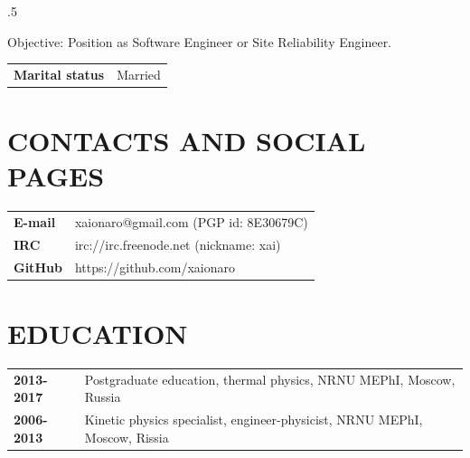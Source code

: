 \address{Limassol, Cyprus}


\begin{resume}
\vspace{0.1in}
\moveleft.5\sectionwidth\centerline{Objective: Position as Software Engineer or Site Reliability Engineer.}

\begin{tabular}{rl}
 {\bf Marital status} & Married\\
\end{tabular}

\section{CONTACTS AND SOCIAL PAGES}
\vspace{0.1in} 
\begin{tabular}{ll}
 {\bf E-mail} & xaionaro@gmail.com (PGP id: 8E30679C)\\
 {\bf IRC}    & irc://irc.freenode.net (nickname: xai)\\
 {\bf GitHub} & https://github.com/xaionaro\\
\end{tabular}

\section{EDUCATION}
\vspace{0.1in} 
\begin{tabular}{ll}
 {\bf 2013-2017} & Postgraduate education, thermal physics, NRNU MEPhI, Moscow, Russia\\
 {\bf 2006-2013} & Kinetic physics specialist, engineer-physicist, NRNU MEPhI, Moscow, Rissia\\
\end{tabular}


\end{resume}
